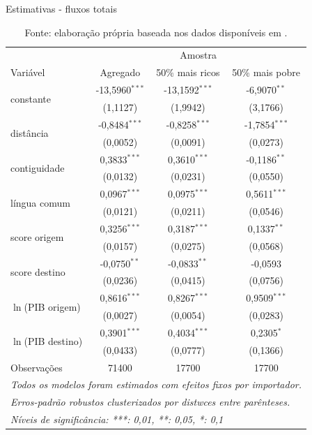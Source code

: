 \begin{table}[H]
\centering
\caption{Estimativas - fluxos totais}
\label{tab:resultados_totais}
\begin{tabular}{@{}lccc@{}}
 & \multicolumn{3}{c}{Amostra} \\ \cmidrule(l){2-4} 
Variável & Agregado & 50\% mais ricos & 50\% mais pobre \\ \midrule
\multirow{2}{*}{constante} & -13,5960$^{***}$ & -13,1592$^{***}$ & -6,9070$^{**}$ \\
 & (1,1127) & (1,9942) & (3,1766) \\
\multirow{2}{*}{distância} & -0,8484$^{***}$ & -0,8258$^{***}$ & -1,7854$^{***}$ \\
 & (0,0052) & (0,0091) & (0,0273) \\
\multirow{2}{*}{contiguidade} & 0,3833$^{***}$ & 0,3610$^{***}$ & -0,1186$^{**}$ \\
 & (0,0132) & (0,0231) & (0,0550) \\
\multirow{2}{*}{língua comum} & 0,0967$^{***}$ & 0,0975$^{***}$ & 0,5611$^{***}$ \\
 & (0,0121) & (0,0211) & (0,0546) \\
\multirow{2}{*}{score origem} & 0,3256$^{***}$ & 0,3187$^{***}$ & 0,1337$^{**}$ \\
 & (0,0157) & (0,0275) & (0,0568) \\
\multirow{2}{*}{score destino} & -0,0750$^{**}$ & -0,0833$^{**}$ & -0,0593 \\
 & (0,0236) & (0,0415) & (0,0756) \\
\multirow{2}{*}{$\ln$(PIB origem)} & 0,8616$^{***}$ & 0,8267$^{***}$ & 0,9509$^{***}$ \\
 & (0,0027) & (0,0054) & (0,0283) \\
\multirow{2}{*}{$\ln$(PIB destino)} & 0,3901$^{***}$ & 0,4034$^{***}$ & 0,2305$^{*}$ \\
 & (0,0433) & (0,0777) & (0,1366) \\ \midrule
Observações& 71400&17700&17700\\
\bottomrule\bottomrule
\multicolumn{4}{l}{\emph{Todos os modelos foram estimados com efeitos fixos por importador.}}\\
\multicolumn{4}{l}{\emph{Erros-padrão robustos clusterizados por distwces entre parênteses.}}\\
\multicolumn{4}{l}{\emph{Níveis de significância: ***: 0,01, **: 0,05, *: 0,1}}\\
\end{tabular}%
\caption*{\RaggedRight  Fonte: elaboração própria baseada nos dados disponíveis em \cite{Cepii2019, Comtrade2019, WorldBank2019}.} 
\end{table}

